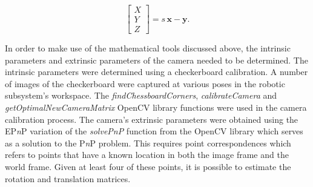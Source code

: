 \begin{equation}
	\begin{bmatrix}
		X \\ 
		Y \\ 
		Z
	\end{bmatrix}=
	s\,\textbf{x}-\textbf{y}.
	\label{eqn:expanded-pinhole-camera-mapping-final}
\end{equation}


%

In order to make use of the mathematical tools discussed above, the intrinsic parameters and extrinsic parameters of the camera needed to be determined. The intrinsic parameters were determined using a checkerboard calibration. A number of images of the checkerboard were captured at various poses in the robotic subsystem's workspace. The \textit{findChessboardCorners}, \textit{calibrateCamera} and \textit{getOptimalNewCameraMatrix} OpenCV library functions were used in the camera calibration process. The camera's extrinsic parameters were obtained using the EP\textit{n}P variation of the \textit{solvePnP} function from the OpenCV library which serves as a solution to the P\textit{n}P problem. This requires point correspondences which refers to points that have a known location in both the image frame and the world frame. Given at least four of these points, it is possible to estimate the rotation and translation matrices.

